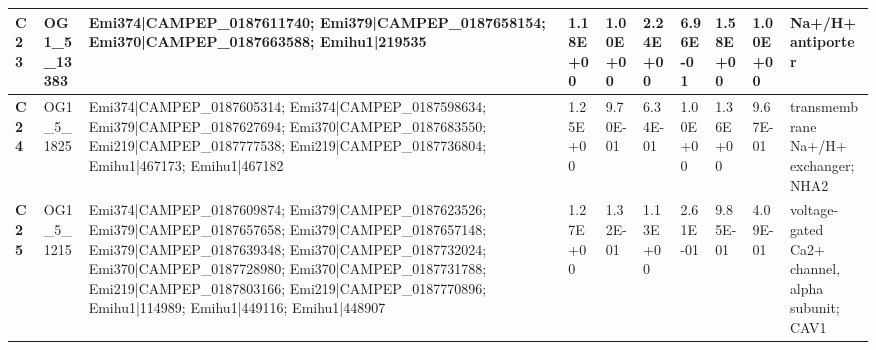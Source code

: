 \begin{landscape}
\begin{center}
\begin{footnotesize}
\begin{longtable}{|p{0.5cm}|p{1.5cm}|p{4cm}|l|l|l|l|l|l|l|}
\textbf{C23} & OG1\_5\_13383 & Emi374|CAMPEP\_0187611740; Emi379|CAMPEP\_0187658154; Emi370|CAMPEP\_0187663588; Emihu1|219535                                                                                                                                                                                                                                                                                                                                                                                                                                                                                                                                           & 1.18E+00  & 1.00E+00 & 2.24E+00  & 6.96E-01 & 1.58E+00  & 1.00E+00 & Na+/H+ antiporter                                                            \\ \hline
\textbf{C24} & OG1\_5\_1825  & Emi374|CAMPEP\_0187605314; Emi374|CAMPEP\_0187598634; Emi379|CAMPEP\_0187627694; Emi370|CAMPEP\_0187683550; Emi219|CAMPEP\_0187777538; Emi219|CAMPEP\_0187736804; Emihu1|467173; Emihu1|467182                                                                                                                                                                                                                                                                                                                                                                                                                                           & 1.25E+00  & 9.70E-01 & 6.34E-01  & 1.00E+00 & 1.36E+00  & 9.67E-01 & transmembrane Na+/H+ exchanger;NHA2                                          \\ \hline
\textbf{C25} & OG1\_5\_1215  & Emi374|CAMPEP\_0187609874; Emi379|CAMPEP\_0187623526; Emi379|CAMPEP\_0187657658; Emi379|CAMPEP\_0187657148; Emi379|CAMPEP\_0187639348; Emi370|CAMPEP\_0187732024; Emi370|CAMPEP\_0187728980; Emi370|CAMPEP\_0187731788; Emi219|CAMPEP\_0187803166; Emi219|CAMPEP\_0187770896; Emihu1|114989; Emihu1|449116; Emihu1|448907                                                                                                                                                                                                                                                                                                                & 1.27E+00  & 1.32E-01 & 1.13E+00  & 2.61E-01 & 9.85E-01  & 4.09E-01 & voltage-gated Ca2+ channel, alpha subunit; CAV1                              \\ \hline

\end{longtable}
\end{footnotesize}
\end{center}
\end{landscape}
